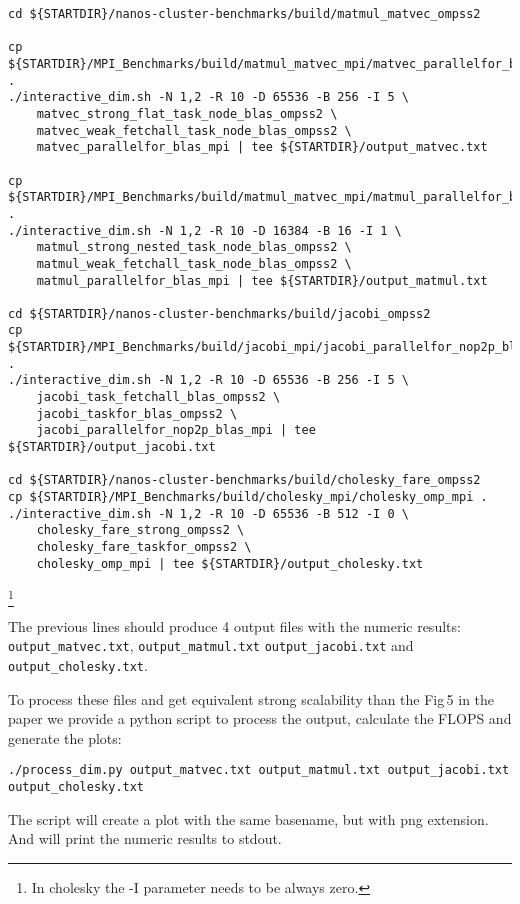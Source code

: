 \documentclass{article}
\newcommand{\code}[1]{\texttt{#1}}
\begin{document}
\begin{lstlisting}
cd ${STARTDIR}/nanos-cluster-benchmarks/build/matmul_matvec_ompss2

cp ${STARTDIR}/MPI_Benchmarks/build/matmul_matvec_mpi/matvec_parallelfor_blas_mpi .
./interactive_dim.sh -N 1,2 -R 10 -D 65536 -B 256 -I 5 \
	matvec_strong_flat_task_node_blas_ompss2 \
	matvec_weak_fetchall_task_node_blas_ompss2 \
	matvec_parallelfor_blas_mpi | tee ${STARTDIR}/output_matvec.txt

cp ${STARTDIR}/MPI_Benchmarks/build/matmul_matvec_mpi/matmul_parallelfor_blas_mpi .
./interactive_dim.sh -N 1,2 -R 10 -D 16384 -B 16 -I 1 \
	matmul_strong_nested_task_node_blas_ompss2 \
	matmul_weak_fetchall_task_node_blas_ompss2 \
	matmul_parallelfor_blas_mpi | tee ${STARTDIR}/output_matmul.txt

cd ${STARTDIR}/nanos-cluster-benchmarks/build/jacobi_ompss2
cp ${STARTDIR}/MPI_Benchmarks/build/jacobi_mpi/jacobi_parallelfor_nop2p_blas_mpi .
./interactive_dim.sh -N 1,2 -R 10 -D 65536 -B 256 -I 5 \
	jacobi_task_fetchall_blas_ompss2 \
	jacobi_taskfor_blas_ompss2 \
	jacobi_parallelfor_nop2p_blas_mpi | tee ${STARTDIR}/output_jacobi.txt

cd ${STARTDIR}/nanos-cluster-benchmarks/build/cholesky_fare_ompss2
cp ${STARTDIR}/MPI_Benchmarks/build/cholesky_mpi/cholesky_omp_mpi .
./interactive_dim.sh -N 1,2 -R 10 -D 65536 -B 512 -I 0 \
	cholesky_fare_strong_ompss2 \
	cholesky_fare_taskfor_ompss2 \
	cholesky_omp_mpi | tee ${STARTDIR}/output_cholesky.txt
\end{lstlisting}

\footnote{In cholesky the -I parameter needs to be always zero.}

The previous lines should produce 4 output files with the numeric
results: \code{output\_matvec.txt}, \code{output\_matmul.txt}
\code{output\_jacobi.txt} and \code{output\_cholesky.txt}.

To process these files and get equivalent strong scalability than the
Fig\,5 in the paper we provide a python script to process the output,
calculate the FLOPS and generate the plots:

\begin{lstlisting}
./process_dim.py output_matvec.txt output_matmul.txt output_jacobi.txt output_cholesky.txt
\end{lstlisting}

The script will create a plot with the same basename, but with png
extension. And will print the numeric results to stdout.
\end{document}

